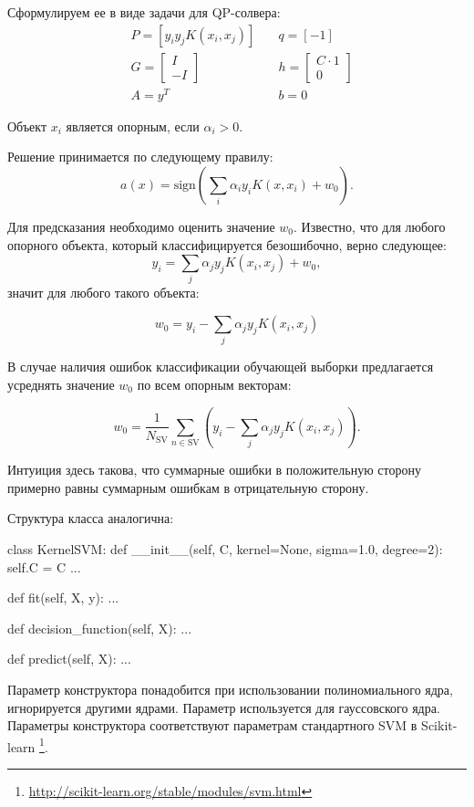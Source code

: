 \documentclass[a4paper,12pt]{article}
\begin{document}
Сформулируем ее в виде задачи для QP-солвера:
$$
\begin{aligned}
    &P = \left[ y_{i}y_{j}K(x_{i}, x_{j}) \right] \quad
    &q = \left[ -1 \right] \\
    &G = \left[ \begin{array}{c} I \\ \hline -I \end{array} \right] \quad \quad
    &h = \left[ \begin{array}{c} C\cdot 1 \\ \hline 0 \end{array} \right] \\
    &A = y^T\quad
    &b = 0
\end{aligned}
$$

Объект $x_i$ является опорным, если $\alpha_i > 0$.

Решение принимается по следующему правилу:
$$a(x) = \text{sign}\left(\sum\limits_{i}\alpha_{i}y_{i}K(x, x_{i}) + w_0\right).$$

Для предсказания необходимо оценить значение $w_0$. Известно, что для любого опорного объекта, который классифицируется безошибочно, верно следующее:
$$y_i = \sum\limits_{j}\alpha_{j}y_{j} K(x_{i}, x_{j}) + w_0,$$
значит для любого такого объекта:

$$w_0 = y_i - \sum\limits_{j}\alpha_{j} y_{j} K(x_{i}, x_{j})$$

В случае наличия ошибок классификации обучающей выборки предлагается усреднять значение $w_0$ по всем опорным векторам:

$$w_0 = \frac{1}{N_\text{SV}}\sum_{n \in \text{SV}} \left(y_i - \sum\limits_{j} \alpha_{j} y_{j} K(x_{i}, x_{j})\right).$$

Интуиция здесь такова, что суммарные ошибки в положительную сторону примерно равны суммарным ошибкам в отрицательную сторону.

Структура класса аналогична:
\begin{python3}
class KernelSVM:
    def __init__(self, C, kernel=None, sigma=1.0, degree=2):
        self.C = C
        ...
    
    def fit(self, X, y):
        ...
    
    def decision_function(self, X):
        ...
        
    def predict(self, X):
        ...
\end{python3}

Параметр конструктора  понадобится при использовании полиномиального ядра, игнорируется другими ядрами. Параметр  используется для гауссовского ядра. Параметры конструктора соответствуют параметрам стандартного SVM в Scikit-learn \footnote{\url{http://scikit-learn.org/stable/modules/svm.html}}.
\end{document}

